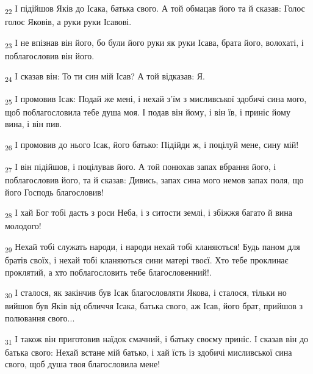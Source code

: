 \begin{tcolorbox}
\textsubscript{22} І підійшов Яків до Ісака, батька свого. А той обмацав його та й сказав: Голос голос Яковів, а руки руки Ісавові.
\end{tcolorbox}
\begin{tcolorbox}
\textsubscript{23} І не впізнав він його, бо були його руки як руки Ісава, брата його, волохаті, і поблагословив він його.
\end{tcolorbox}
\begin{tcolorbox}
\textsubscript{24} І сказав він: То ти син мій Ісав? А той відказав: Я.
\end{tcolorbox}
\begin{tcolorbox}
\textsubscript{25} І промовив Ісак: Подай же мені, і нехай з'їм з мисливської здобичі сина мого, щоб поблагословила тебе душа моя. І подав він йому, і він їв, і приніс йому вина, і він пив.
\end{tcolorbox}
\begin{tcolorbox}
\textsubscript{26} І промовив до нього Ісак, його батько: Підійди ж, і поцілуй мене, сину мій!
\end{tcolorbox}
\begin{tcolorbox}
\textsubscript{27} І він підійшов, і поцілував його. А той понюхав запах вбрання його, і поблагословив його, та й сказав: Дивись, запах сина мого немов запах поля, що його Господь благословив!
\end{tcolorbox}
\begin{tcolorbox}
\textsubscript{28} І хай Бог тобі дасть з роси Неба, і з ситости землі, і збіжжя багато й вина молодого!
\end{tcolorbox}
\begin{tcolorbox}
\textsubscript{29} Нехай тобі служать народи, і народи нехай тобі кланяються! Будь паном для братів своїх, і нехай тобі кланяються сини матері твоєї. Хто тебе проклинає проклятий, а хто поблагословить тебе благословенний!.
\end{tcolorbox}
\begin{tcolorbox}
\textsubscript{30} І сталося, як закінчив був Ісак благословляти Якова, і сталося, тільки но вийшов був Яків від обличчя Ісака, батька свого, аж Ісав, його брат, прийшов з полювання свого...
\end{tcolorbox}
\begin{tcolorbox}
\textsubscript{31} І також він приготовив наїдок смачний, і батьку своєму приніс. І сказав він до батька свого: Нехай встане мій батько, і хай їсть із здобичі мисливської сина свого, щоб душа твоя благословила мене!
\end{tcolorbox}
